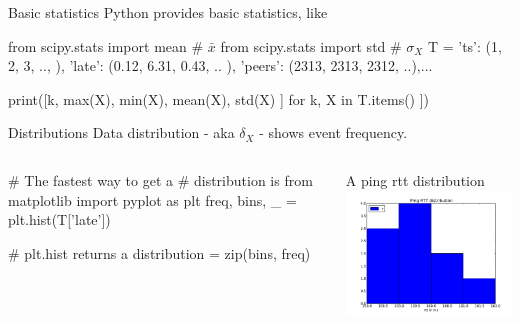 \documentclass{beamer}[10]
\begin{document}

\begin{pyframe}{Basic statistics}
Python provides basic statistics, like
\begin{pycode}
from scipy.stats import mean	# $\bar{x}$
from scipy.stats import std	# $\sigma_{X}$
T = { 'ts': (1, 2, 3, .., ),
      'late': (0.12, 6.31, 0.43, .. ),
      'peers': (2313, 2313, 2312, ..),...}
      
print([k, max(X), min(X), mean(X), std(X) ]   
        for k, X in T.items() ])
\end{pycode}
\end{pyframe}



\begin{pyframe}{Distributions}
Data distribution - aka $\delta_{X}$ - shows event frequency.
\begin{columns}
\begin{pycode}
# The fastest way to get a 
#  distribution is
from matplotlib import pyplot as plt
freq, bins, _ = plt.hist(T['late'])

# plt.hist returns a
distribution = zip(bins, freq)
\end{pycode}
A ping rtt distribution
\includegraphics[width=6cm]{ping_distribution.pdf}
\end{columns}
\end{pyframe}
\end{document}
